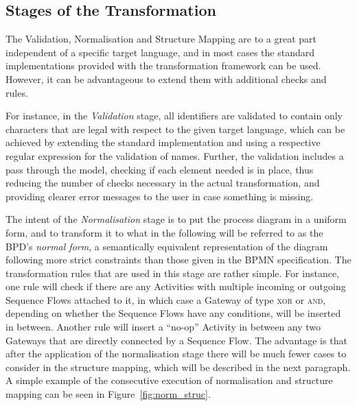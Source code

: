 
\subsection{Stages of the Transformation}
\label{sec:trafo_stages}

The Validation, Normalisation and Structure Mapping are to a great part independent of a specific target language, and in most cases the standard implementations provided with the transformation framework can be used.  However, it can be advantageous to extend them with additional checks and rules.

For instance, in the \emph{Validation} stage, all identifiers are validated to contain only characters that are legal with respect to the given target language, which can be achieved by extending the standard implementation and using a respective regular expression for the validation of names.  Further, the validation includes a pass through the model, checking if each element needed is in place, thus reducing the number of checks necessary in the actual transformation, and providing clearer error messages to the user in case something is missing.

The intent of the \emph{Normalisation} stage is to put the process diagram in a uniform form, and to transform it to what in the following will be referred to as the BPD's \emph{normal form}, a semantically equivalent representation of the diagram following more strict constraints than those given in the BPMN specification.  The transformation rules that are used in this stage are rather simple.  For instance, one rule will check if there are any Activities with multiple incoming or outgoing Sequence Flows attached to it, in which case a Gateway of type \textsc{xor} or \textsc{and}, depending on whether the Sequence Flows have any conditions, will be inserted in between.  Another rule will insert a ``no-op'' Activity in between any two Gateways that are directly connected by a Sequence Flow.  The advantage is that after the application of the normalisation stage there will be much fewer cases to consider in the structure mapping, which will be described in the next paragraph. A simple example of the consecutive execution of normalisation and structure mapping can be seen in Figure~\ref{fig:norm_struc}.

